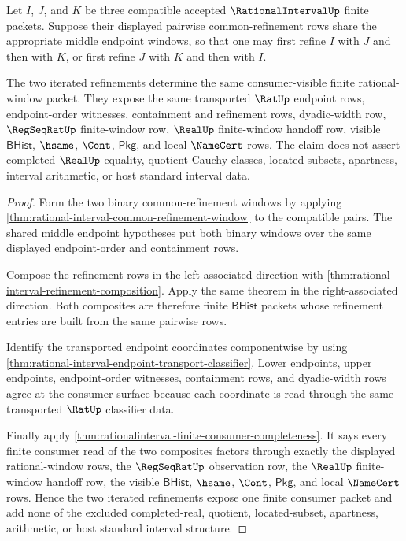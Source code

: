\begin{theorem}
\label{thm:rationalinterval-common-refinement-associativity}
Let $I$, $J$, and $K$ be three compatible accepted
$\RationalIntervalUp$ finite packets. Suppose their displayed pairwise
common-refinement rows share the appropriate middle endpoint windows, so that
one may first refine $I$ with $J$ and then with $K$, or first refine $J$ with
$K$ and then with $I$.

The two iterated refinements determine the same consumer-visible finite
rational-window packet. They expose the same transported $\RatUp$ endpoint
rows, endpoint-order witnesses, containment and refinement rows, dyadic-width
row, $\RegSeqRatUp$ finite-window row, $\RealUp$ finite-window handoff row,
visible $\mathsf{BHist}$, $\hsame$, $\Cont$, $\mathsf{Pkg}$, and local
$\NameCert$ rows. The claim does not assert completed $\RealUp$ equality,
quotient Cauchy classes, located subsets, apartness, interval arithmetic, or
host standard interval data.
\end{theorem}
\begin{proof}
Form the two binary common-refinement windows by applying
\autoref{thm:rational-interval-common-refinement-window} to the compatible
pairs. The shared middle endpoint hypotheses put both binary windows over the
same displayed endpoint-order and containment rows.

Compose the refinement rows in the left-associated direction with
\autoref{thm:rational-interval-refinement-composition}. Apply the same theorem
in the right-associated direction. Both composites are therefore finite
$\mathsf{BHist}$ packets whose refinement entries are built from the same
pairwise rows.

Identify the transported endpoint coordinates componentwise by using
\autoref{thm:rational-interval-endpoint-transport-classifier}. Lower
endpoints, upper endpoints, endpoint-order witnesses, containment rows, and
dyadic-width rows agree at the consumer surface because each coordinate is read
through the same transported $\RatUp$ classifier data.

Finally apply
\autoref{thm:rationalinterval-finite-consumer-completeness}. It says every
finite consumer read of the two composites factors through exactly the
displayed rational-window rows, the $\RegSeqRatUp$ observation row, the
$\RealUp$ finite-window handoff row, the visible $\mathsf{BHist}$, $\hsame$,
$\Cont$, $\mathsf{Pkg}$, and local $\NameCert$ rows. Hence the two iterated
refinements expose one finite consumer packet and add none of the excluded
completed-real, quotient, located-subset, apartness, arithmetic, or host
standard interval structure.
\end{proof}


